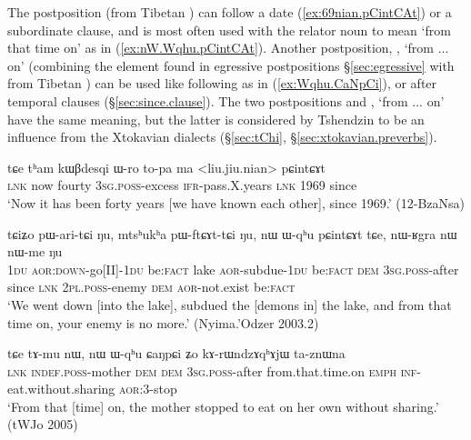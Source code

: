 The postposition  (from Tibetan ) can follow a date (\ref{ex:69nian.pCintCAt}) or a subordinate clause, and is most often used with the relator noun  to mean `from that time on' as in (\ref{ex:nW.Wqhu.pCintCAt}). Another postposition,  , `from ... on' (combining the  element found in egressive postpositions §\ref{sec:egressive}  with  from Tibetan ) can be used like  following   as in (\ref{ex:Wqhu.CaNpCi}), or after temporal clauses (§\ref{sec:since.clause}). The two postpositions  and , `from ... on' have the same meaning, but the latter is considered by Tshendzin to be an influence from the Xtokavian dialects (§\ref{sec:tChi}, §\ref{sec:xtokavian.preverbs}).

 \begin{exe}
\ex \label{ex:69nian.pCintCAt}
 \gll tɕe tʰam kɯβdesqi ɯ-ro to-pa ma <liu.jiu.nian> pɕintɕɤt \\
 \textsc{lnk} now fourty \textsc{3sg}.\textsc{poss}-excess \textsc{ifr}-pass.X.years \textsc{lnk}  1969 since \\
 \glt `Now it has been forty years [we have known each other], since 1969.' (12-BzaNsa) 
 \end{exe}
 
  \begin{exe}
\ex \label{ex:nW.Wqhu.pCintCAt}
 \gll  tɕiʑo pɯ-ari-tɕi ŋu, mtsʰukʰa pɯ-ftɕɤt-tɕi ŋu, nɯ ɯ-qʰu pɕintɕɤt tɕe, nɯ-ʁgra nɯ nɯ-me ŋu \\
 \textsc{1du} \textsc{aor}:\textsc{down}-go[II]-\textsc{1du} be:\textsc{fact} lake \textsc{aor}-subdue-\textsc{1du} be:\textsc{fact} \textsc{dem} \textsc{3sg}.\textsc{poss}-after since \textsc{lnk} \textsc{2pl}.\textsc{poss}-enemy \textsc{dem} \textsc{aor}-not.exist be:\textsc{fact} \\
 \glt `We went down [into the lake], subdued the [demons in] the lake, and from that time on, your enemy is no more.' (Nyima.'Odzer 2003.2)
 \end{exe}
 
 \begin{exe}
\ex \label{ex:Wqhu.CaNpCi}
\gll  tɕe tɤ-mu nɯ, nɯ ɯ-qʰu ɕaŋpɕi ʑo kɤ-rɯndzɤqʰɤjɯ ta-znɯna \\
\textsc{lnk} \textsc{indef}.\textsc{poss}-mother \textsc{dem} \textsc{dem} \textsc{3sg}.\textsc{poss}-after from.that.time.on \textsc{emph} \textsc{inf}-eat.without.sharing \textsc{aor}:3\flobv{}-stop \\
\glt `From that [time] on, the mother stopped to eat on her own without sharing.' (tWJo 2005) 
\end{exe}

